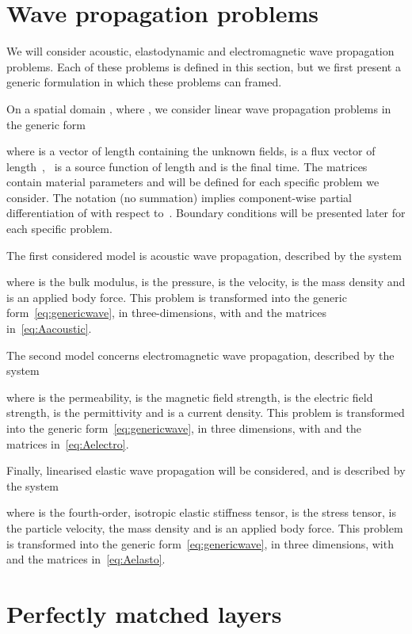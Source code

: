 \documentclass[a4paper]{article}
\begin{document}
\section{Wave propagation problems}
\label{sec:problem}

We will consider acoustic, elastodynamic and electromagnetic wave
propagation problems. Each of these problems is defined in this
section, but we first present a generic formulation in which these
problems can framed.

On a spatial domain , where , we consider linear wave propagation problems in the generic
form

where  is a vector of length  containing the  unknown
fields,  is a flux vector of
length~, ~is a source function of length  and  is
the final time. The matrices  contain material parameters
and will be defined for each specific problem we consider. The
notation  (no
summation) implies component-wise partial differentiation of
 with respect to~.  Boundary conditions
will be presented later for each specific problem.

The first considered model is acoustic wave propagation, described by
the system

where  is the bulk modulus,  is the pressure,  is
the velocity,  is the mass density and  is an
applied body force. This problem is transformed into the generic
form~\eqref{eq:genericwave}, in three-dimensions, with  and the matrices 
in~\eqref{eq:Aacoustic}.

The second model concerns electromagnetic wave propagation, described
by the system

where  is the permeability,  is the magnetic field
strength,  is the electric field strength, 
is the permittivity and  is a current density. This problem
is transformed into the generic form~\eqref{eq:genericwave}, in three
dimensions, with  and the
matrices  in~\eqref{eq:Aelectro}.

Finally, linearised elastic wave propagation will be considered, and
is described by the system

where  is the fourth-order, isotropic elastic
stiffness tensor,  is the stress tensor,  is the
particle velocity,  the mass density and  is an
applied body force. This problem is transformed into the generic
form~\eqref{eq:genericwave}, in three dimensions, with  and the matrices  in~\eqref{eq:Aelasto}.

\section{Perfectly matched layers}
\label{sec:pml}
\end{document}
